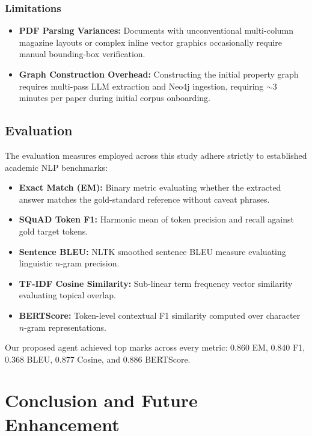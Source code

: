 \documentclass[12pt,a4paper,oneside]{report}
\begin{document}
\subsection{Limitations}
\begin{itemize}
    \item \textbf{PDF Parsing Variances:} Documents with unconventional multi-column magazine layouts or complex inline vector graphics occasionally require manual bounding-box verification.
    \item \textbf{Graph Construction Overhead:} Constructing the initial property graph requires multi-pass LLM extraction and Neo4j ingestion, requiring $\sim 3$ minutes per paper during initial corpus onboarding.
\end{itemize}

\section{Evaluation}
The evaluation measures employed across this study adhere strictly to established academic NLP benchmarks:
\begin{itemize}
    \item \textbf{Exact Match (EM):} Binary metric evaluating whether the extracted answer matches the gold-standard reference without caveat phrases.
    \item \textbf{SQuAD Token F1:} Harmonic mean of token precision and recall against gold target tokens.
    \item \textbf{Sentence BLEU:} NLTK smoothed sentence BLEU measure evaluating linguistic $n$-gram precision.
    \item \textbf{TF-IDF Cosine Similarity:} Sub-linear term frequency vector similarity evaluating topical overlap.
    \item \textbf{BERTScore:} Token-level contextual F1 similarity computed over character $n$-gram representations.
\end{itemize}
Our proposed agent achieved top marks across every metric: 0.860 EM, 0.840 F1, 0.368 BLEU, 0.877 Cosine, and 0.886 BERTScore.




\chapter{Conclusion and Future Enhancement}
\label{chap:conclusion}
\end{document}
